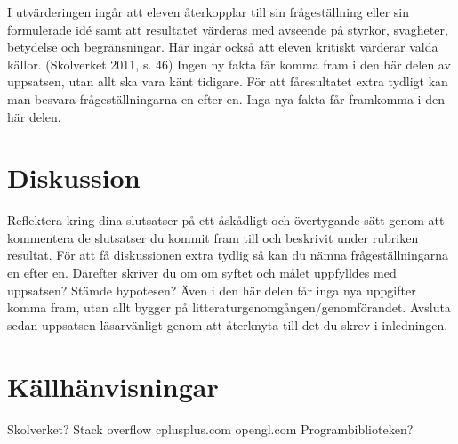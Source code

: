 \documentclass[12pt, a4paper]{article}
\begin{document}
	\begin{small}
		I utvärderingen ingår att eleven återkopplar till sin frågeställning eller sin
formulerade idé samt att resultatet värderas med avseende på styrkor,
svagheter, betydelse och begränsningar. Här ingår också att eleven kritiskt
värderar valda källor. (Skolverket 2011, s. 46) Ingen ny fakta får komma fram i
den här delen av uppsatsen, utan allt ska vara känt tidigare. För att fåresultatet extra tydligt kan man besvara frågeställningarna en efter en. Inga
nya fakta får framkomma i den här delen.
	\end{small}
	
	\newpage
	\section{Diskussion}
	
	\begin{small}
		Reflektera kring dina slutsatser på ett åskådligt och övertygande sätt genom
att kommentera de slutsatser du kommit fram till och beskrivit under rubriken
resultat. För att få diskussionen extra tydlig så kan du nämna
frågeställningarna en efter en. Därefter skriver du om om syftet och målet
uppfylldes med uppsatsen? Stämde hypotesen? Även i den här delen får inga
nya uppgifter komma fram, utan allt bygger på
litteraturgenomgången/genomförandet.
Avsluta sedan uppsatsen läsarvänligt genom att återknyta till det du skrev i
inledningen.
	\end{small}
	
	\newpage
	\section{Källhänvisningar}
	Skolverket?
	Stack overflow
	cplusplus.com
	opengl.com
	Programbiblioteken?
	
\end{document}
